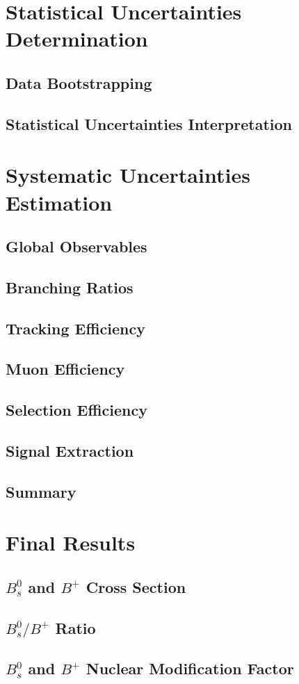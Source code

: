 \section{Statistical Uncertainties Determination} 

\subsection{Data Bootstrapping}

\subsection{Statistical Uncertainties Interpretation}

\section{Systematic Uncertainties Estimation} 

\subsection{Global Observables}

\subsection{Branching Ratios}

\subsection{Tracking Efficiency}

\subsection{Muon Efficiency}

\subsection{Selection Efficiency}

\subsection{Signal Extraction}

\subsection{Summary}

\section{Final Results} 

\subsection{$B^0_s$ and $B^{+}$ Cross Section}

\subsection{$B^0_s/B^{+}$ Ratio}

\subsection{$B^0_s$ and $B^{+}$ Nuclear Modification Factor}

